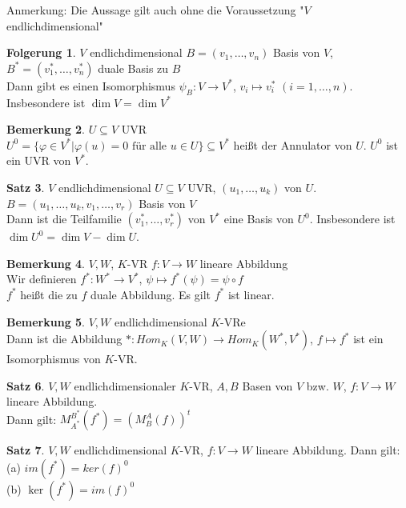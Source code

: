 \documentclass[10pt,a4paper,numbers=endperiod]{scrartcl}
\theoremstyle{definition}
\newtheorem{satz}{Satz}[section]
\newtheorem{bem}[satz]{Bemerkung}
\newtheorem{folg}[satz]{Folgerung}
\begin{document}
Anmerkung: Die Aussage gilt auch ohne die Voraussetzung "$V$ endlichdimensional"

\begin{folg}
	$V$ endlichdimensional $B = (v_1, \ldots, v_n)$ Basis von $V$, $B^* = (v_1^*, \ldots, v_n^*)$ duale Basis zu $B$\\
	Dann gibt es einen Isomorphismus $\psi_B: V \rightarrow V^*$, $v_i \mapsto
	 v_i^*$ $(i = 1, \ldots, n)$. Insbesondere ist $\dim V  = \dim V^*$
\end{folg}

\begin{bem}
	$U \subseteq V$ UVR\\
	$U^0 = \{\varphi \in V^* | \varphi(u) = 0 \text{ für alle } u \in U\} \subseteq V^*$ heißt der Annulator von $U$. $U^0$ ist ein UVR von $V^*$. 
\end{bem}

\begin{satz}
	$V$ endlichdimensional $U \subseteq V$ UVR, $(u_1, \ldots, u_k)$ von $U$. $B = (u_1, \ldots, u_k, v_1, \ldots, v_r)$ Basis von $V$\\
	Dann ist die Teilfamilie $(v_1^*, \ldots, v_r^*)$ von $V^*$ eine Basis von $U^0$. Insbesondere ist $\dim U^0 = \dim V - \dim U$. 
\end{satz}

\begin{bem}
	$V, W$, $K$-VR $f: V \rightarrow W$ lineare Abbildung\\
	Wir definieren $f^*: W^* \rightarrow V^*$, $\psi \mapsto f^*(\psi) = \psi \circ f$\\
	$f^*$ heißt die zu $f$ duale Abbildung. Es gilt $f^*$ ist linear.
\end{bem}

\begin{bem}
	$V, W$ endlichdimensional $K$-VRe\\
	Dann ist die Abbildung $*: Hom_K(V,W) \rightarrow Hom_K(W^*,V^*)$, $f \mapsto f^*$ ist ein Isomorphismus von $K$-VR. 
\end{bem}

\begin{satz}
	$V, W$ endlichdimensionaler $K$-VR, $A, B$ Basen von $V$ bzw. $W$, $f: V \rightarrow W$ lineare Abbildung.\\
	Dann gilt: $M_{A^*}^{B^*} (f^*) = (M_B^{A}(f))^t$
\end{satz}

\begin{satz}
	$V, W$ endlichdimensional $K$-VR, $f: V \rightarrow W$ lineare Abbildung. Dann gilt:\\
	(a) $im(f^*) = ker(f)^{0}$\\
	(b) $\ker(f^*) = im(f)^{0}$ 
\end{satz}
\end{document}
